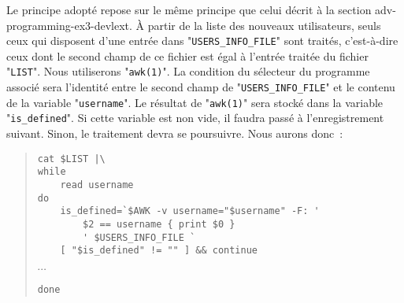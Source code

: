 Le principe adopt{\'e} repose sur le m{\^e}me principe que celui d{\'e}crit {\`a} la section 
{adv-programming-ex3-devlext}. {\`A} partir de la liste des nouveaux utilisateurs, seuls
ceux qui disposent d'une entr{\'e}e dans "{\tt USERS\_INFO\_FILE}" sont trait{\'e}s,
c'est-{\`a}-dire ceux dont le second champ de ce fichier est {\'e}gal {\`a} l'entr{\'e}e trait{\'e}e
du fichier "{\tt LIST}". Nous utiliserons "{\tt awk(1)}". La condition du 
s{\'e}lecteur du programme associ{\'e} sera l'identit{\'e} entre le second champ de
"{\tt USERS\_INFO\_FILE}" et le contenu de la variable "{\tt username}". Le
r{\'e}sultat de "{\tt awk(1)}" sera stock{\'e} dans la variable "{\tt is\_defined}".
Si cette variable est non vide, il faudra pass{\'e} {\`a} l'enregistrement suivant. Sinon, le
traitement devra se poursuivre. Nous aurons donc~:
\begin{quote}
\begin{verbatim}
cat $LIST |\
while
    read username
do
    is_defined=`$AWK -v username="$username" -F: '
        $2 == username { print $0 }
        ' $USERS_INFO_FILE `
    [ "$is_defined" != "" ] && continue
\end{verbatim}
$\cdots$
\begin{verbatim}
done
\end{verbatim}
\end{quote}

